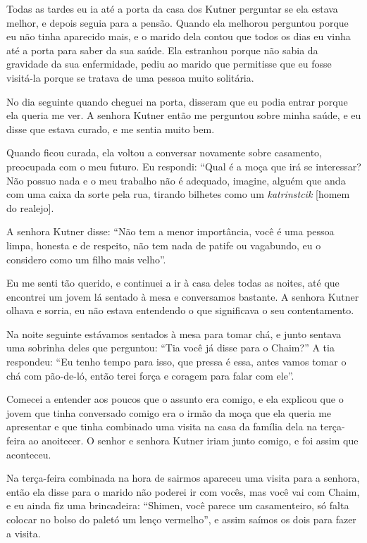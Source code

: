 Todas as tardes eu ia até a porta da casa dos Kutner perguntar se ela
estava melhor, e depois seguia para a pensão. Quando ela melhorou perguntou
porque eu não tinha aparecido mais, e o marido dela contou que todos os
dias eu vinha até a porta para saber da sua saúde. Ela estranhou porque
não sabia da gravidade da sua enfermidade, pediu ao marido que
permitisse que eu fosse visitá-la porque se tratava de uma pessoa muito
solitária.

No dia seguinte quando cheguei na porta, disseram que eu podia entrar
porque ela queria me ver. A senhora Kutner então me perguntou sobre
minha saúde, e eu disse que estava curado, e me sentia muito bem.

Quando ficou curada, ela voltou a conversar novamente sobre casamento,
preocupada com o meu futuro. Eu respondi: ``Qual é a moça que irá se
interessar? Não possuo nada e o meu trabalho não é adequado, imagine,
alguém que anda com uma caixa da sorte pela rua, tirando bilhetes como
um \textit{katrinstcik} [homem do realejo].

A senhora Kutner disse: ``Não tem a menor importância, você é uma pessoa
limpa, honesta e de respeito, não tem nada de patife ou vagabundo, eu o
considero como um filho mais velho''.

Eu me senti tão querido, e continuei a ir à casa deles todas as noites,
até que encontrei um jovem lá sentado à mesa e conversamos bastante. A
senhora Kutner olhava e sorria, eu não estava entendendo o que
significava o seu contentamento.

Na noite seguinte estávamos sentados à mesa para tomar chá, e junto
sentava uma sobrinha deles que perguntou: ``Tia você já disse para o
Chaim?'' A tia respondeu: ``Eu tenho tempo para isso, que pressa é essa,
antes vamos tomar o chá com pão-de-ló, então terei força e coragem para
falar com ele''.

Comecei a entender aos poucos que o assunto era comigo, e ela explicou
que o jovem que tinha conversado comigo era o irmão da moça que ela
queria me apresentar e que tinha combinado uma visita na casa da família
dela na terça-feira ao anoitecer. O senhor e senhora Kutner iriam junto
comigo, e foi assim que aconteceu.

Na terça-feira combinada na hora de sairmos apareceu uma visita para a
senhora, então ela disse para o marido não poderei ir com vocês, mas
você vai com Chaim, e eu ainda fiz uma brincadeira: ``Shimen, você
parece um casamenteiro, só falta colocar no bolso do paletó um lenço
vermelho'', e assim saímos os dois para fazer a visita.

